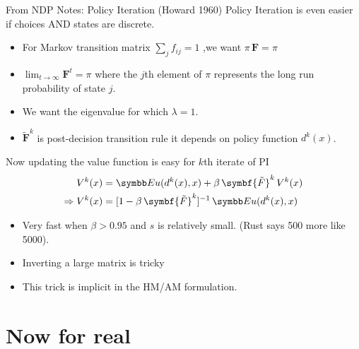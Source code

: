 \documentclass[aspectratio=169,11pt]{beamer}
\begin{document}
\begin{frame}{From NDP Notes:  Policy Iteration (Howard 1960)}
\footnotesize
Policy Iteration is even easier if choices AND states are discrete.
\begin{itemize}
\item For Markov transition matrix $\sum_j f_{ij} =1$ ,we want $\pi \, \symbf{F} = \pi$
\item $\lim_{t \rightarrow \infty} \symbf{F}^t = \pi$ where the $j$th element of $\pi$ represents the long run probability of state $j$.
\item We want the eigenvalue for which $\lambda = 1$.
\item $\symbf{\tilde{F}}^k$ is \alert{post-decision transition rule} it depends on \alert{policy function} $d^k(x)$.
\end{itemize}
Now updating the value function is easy for $k$th iterate of PI
\begin{align*}
V^k(x) &= \E u(d^k(x),x) + \beta \, \symbf{\tilde{F}}^k \, V^k(x)\\
\Rightarrow V^k(x) &= [1 - \beta \, \symbf{\tilde{F}}^k]^{-1}\, \E u(d^k(x),x)
\end{align*}
\vspace{-.5cm}
\begin{itemize}
\item Very fast when $\beta > 0.95$ and $s$ is relatively small. (Rust says 500 more like 5000).
\item Inverting a large matrix is tricky
\item \alert{This trick is implicit in the HM/AM formulation}.
\end{itemize}
\end{frame}


\section*{Now for real}
\end{document}
